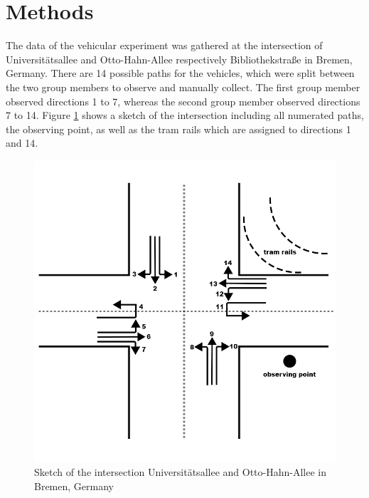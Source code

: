 \section{Methods}
\label{sec:Methods}

The data of the vehicular experiment was gathered at the intersection of Universitätsallee and Otto-Hahn-Allee respectively Bibliothekstraße in Bremen, Germany. There are 14 possible paths for the vehicles,
which were split between the two group members to observe and manually collect. The first group member observed directions 1 to 7, whereas the second group member observed directions 7 to 14. Figure \ref{fig:intersection} shows a sketch of the intersection including all numerated paths, the observing point, as well as the tram rails which are assigned to directions 1 and 14. 
\begin{figure}[hbtp]
\centering
\includegraphics[width=.9\linewidth]{intersection.jpg}
\caption{Sketch of the intersection Universitätsallee and Otto-Hahn-Allee in Bremen, Germany}
\label{fig:intersection}
\end{figure}

